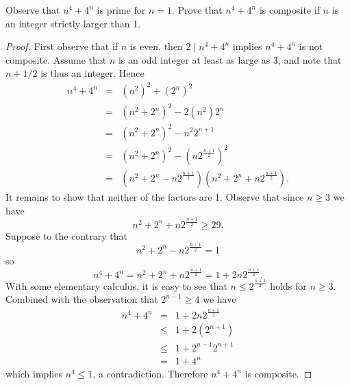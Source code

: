 \documentclass[10pt]{amsart}
\begin{document}
\begin{thm}\label{ex3}
  Observe that $n^4 + 4^n$ is prime for $n = 1$.
  Prove that $n^4 + 4^n$ is composite if $n$ is an integer strictly larger than 1.

  \begin{proof}
    First observe that if $n$ is even, then $2 \mid n^4 + 4^n$ implies $n^4 + 4^n$ is not composite.
    Assume that $n$ is an odd integer at least as large as 3, and note that $n+1/2$ is thus an integer.
    Hence
    \begin{eqnarray*}
      n^4 + 4^n &=& (n^2)^2 + (2^n)^2\\
      &=& (n^2 + 2^n)^2 - 2(n^2)2^n\\
      &=& (n^2 + 2^n)^2 - n^2 2^{n+1}\\
      &=& (n^2 + 2^n)^2 - (n 2^{\frac{n + 1}{2}})^2\\
      &=& (n^2 + 2^n - n 2^{\frac{n + 1}{2}})(n^2 + 2^n + n 2^{\frac{n + 1}{2}}).
    \end{eqnarray*}
    It remains to show that neither of the factors are 1.
    Observe that since $n \geq 3$ we have
    $$n^2 + 2^n + n 2^{\frac{n + 1}{2}} \geq 29.$$
    Suppose to the contrary that 
    $$n^2 + 2^n - n 2^{\frac{n + 1}{2}} = 1$$
    so 
    $$n^4 + 4^n = n^2 + 2^n + n 2^{\frac{n + 1}{2}} = 1 + 2n2^{\frac{n + 1}{2}}.$$
    With some elementary calculus, it is easy to see that $n \leq 2^{\frac{n+1}{2}}$ holds for $n \geq 3$.
    Combined with the observation that $2^{n-1} \geq 4$ we have
    \begin{eqnarray*}
      n^4 + 4^n &=&  1 + 2n2^{\frac{n + 1}{2}}\\
      &\leq& 1 + 2(2^{n+1})\\
      &\leq& 1 + 2^{n-1}2^{n+1}\\
      &=& 1 + 4^n
    \end{eqnarray*}
    which implies $n^4 \leq 1$, a contradiction.
    Therefore $n^4 + 4^n$ is composite.
  \end{proof}
\end{thm}
\end{document}
